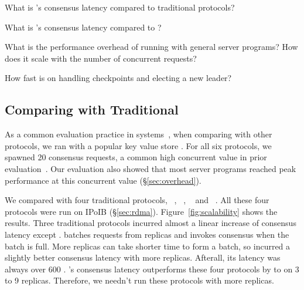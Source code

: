 \begin{tightenum}

\item[\S\ref{sec:eval-traditional}:] What is \xxx's consensus latency compared
to traditional \paxos protocols?

\item[\S\ref{sec:eval-dare}:] What is \xxx's consensus latency compared
to \dare?

\item[\S\ref{sec:overhead}:] What is the performance overhead of running \xxx
with general server programs? How does it scale with the number of concurrent 
requests?


\item[\S\ref{sec:robust}:] How fast is \xxx on handling checkpoints and
electing a new leader?



\end{tightenum}




\subsection{Comparing with Traditional \paxos}
\label{sec:eval-traditional}

As a common evaluation practice in 
\paxos systems~\cite{dare:hpdc15,nopaxos:osdi16}, when comparing \xxx with 
other \paxos protocols, we ran \xxx with a popular key value store \redis. For 
all six \paxos protocols, we spawned 20 consensus requests, a common high 
concurrent value in prior 
evaluation~\cite{zookeeper,crane:sosp15,rex:eurosys14}. Our evaluation also 
showed that most server programs reached peak performance at this concurrent 
value (\S\ref{sec:overhead}).

We compared \xxx with four traditional protocols, \libpaxos~\cite{libpaxos},
\zookeeper~\cite{zookeeper}, \crane~\cite{crane:sosp15} and
\spaxos~\cite{spaxos:srds12}. All these four protocols were run on IPoIB 
(\S\ref{sec:rdma}). Figure~\ref{fig:scalability} shows the results. Three 
traditional protocols incurred almost a linear increase of consensus latency 
except \spaxos. \spaxos batches requests from replicas and invokes consensus 
when the batch is full. More replicas can take shorter time to form a batch, so 
\spaxos incurred a slightly better consensus latency with more replicas. 
Afterall, its latency was always over 600 \us. \xxx's consensus latency 
outperforms these four protocols by \comptradlow to \comptradhigh on 3 to 9 
replicas. Therefore, we needn't run these protocols with more replicas.

